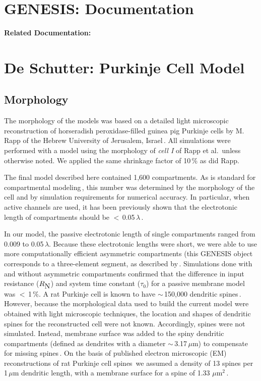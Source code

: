 \documentclass[12pt]{article}
\begin{document}
\section*{GENESIS: Documentation}

{\bf Related Documentation:}

\section*{De Schutter: Purkinje Cell Model}

\subsection*{Morphology}

The morphology of the models was based on a detailed light
microscopic reconstruction of horseradish peroxidase-filled
guinea pig Purkinje cells by M. Rapp of the Hebrew University of
Jerusalem, Israel\,\cite{Rapp-M:1992kx, Rapp-P:1994qf}. All simulations were
performed with a model using the morphology of {\it cell I} of Rapp et
al.\,\cite{Rapp-P:1994qf} unless otherwise noted. We applied the same shrinkage
factor of 10\,\% as did Rapp.

The final model described here contained 1,600 compartments.
As is standard for compartmental modeling\,\cite{rall62:_theor, W:1964oq},
this number was determined by the morphology of the cell and by
simulation requirements for numerical accuracy. In particular,
when active channels are used, it has been previously shown that
the electrotonic length of compartments should be $<$\,0.05\,$\lambda$\,\cite{W:1966ve}.

In our model, the passive electrotonic length of single compartments
ranged from 0.009 to 0.05\,$\lambda$. Because these electrotonic
lengths were short, we were able to use more computationally
efficient asymmetric compartments (this GENESIS object corresponds
to a three-element segment, as described by\,\cite{Segev-I:1985kl}. 
Simulations done with and without asymmetric compartments
confirmed that the difference in input resistance ($R_{\mbox N}$) and
system time constant ($\tau_0$) for a passive membrane model was
$<$\,1\,\%.
A rat Purkinje cell is known to have $\sim$\,150,000 dendritic spines\,\cite{Harvey:1991xz}. 
However, because the morphological
data used to build the current model were obtained with light
microscopic techniques, the location and shapes of dendritic
spines for the reconstructed cell were not known. Accordingly,
spines were not simulated. Instead, membrane surface was added
to the spiny dendritic compartments (defined as dendrites with a
diameter $\sim$\,3.17\,$\mu$m) to compensate for missing 
spines\,\cite{R:1989cr, Rapp-M:1992kx}. On the basis of published
electron microscopic (EM) reconstructions of rat Purkinje cell
spines\,\cite{M:1988bh} we assumed a density of 13
spines per 1\,$\mu$m dendritic length, with a membrane surface for a
spine of 1.33 $\mu$m$^2$\,\cite{M:1988bh}.



\end{document}
